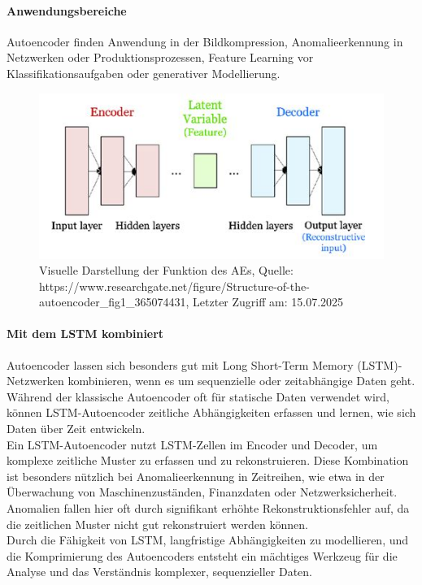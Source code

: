 \documentclass[a4paper,12pt]{article}
\begin{document}
	\paragraph{Anwendungsbereiche}
	Autoencoder finden Anwendung in der Bildkompression, Anomalieerkennung in Netzwerken oder Produktionsprozessen, Feature Learning vor Klassifikationsaufgaben oder generativer Modellierung. 
	
	\begin{figure}[H]
		\centering
		\includegraphics[width=0.7\linewidth]{Bilder/screenshot004}
		\caption{Visuelle Darstellung der Funktion des AEs, Quelle: https://www.researchgate.net/figure/Structure-of-the-autoencoder\_fig1\_365074431, Letzter Zugriff am: 15.07.2025}
		\label{fig:screenshot004}
	\end{figure}
	
	\paragraph{Mit dem LSTM kombiniert}
	Autoencoder lassen sich besonders gut mit Long Short-Term Memory (LSTM)-Netzwerken kombinieren, wenn es um sequenzielle oder zeitabhängige Daten geht. Während der klassische Autoencoder oft für statische Daten verwendet wird, können LSTM-Autoencoder zeitliche Abhängigkeiten erfassen und lernen, wie sich Daten über Zeit entwickeln.
	\\[0.5em]
	Ein LSTM-Autoencoder nutzt LSTM-Zellen im Encoder und Decoder, um komplexe zeitliche Muster zu erfassen und zu rekonstruieren. Diese Kombination ist besonders nützlich bei Anomalieerkennung in Zeitreihen, wie etwa in der Überwachung von Maschinenzuständen, Finanzdaten oder Netzwerksicherheit. Anomalien fallen hier oft durch signifikant erhöhte Rekonstruktionsfehler auf, da die zeitlichen Muster nicht gut rekonstruiert werden können.
	\\[0.5em]
	Durch die Fähigkeit von LSTM, langfristige Abhängigkeiten zu modellieren, und die Komprimierung des Autoencoders entsteht ein mächtiges Werkzeug für die Analyse und das Verständnis komplexer, sequenzieller Daten.
	
\end{document}
